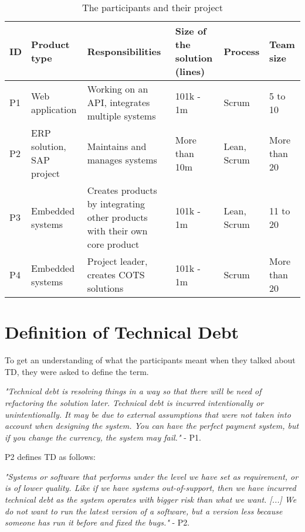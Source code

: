 \begin{table}[ht!]
	\centering
    \begin{tabular}{|p{0.5cm}|p{2.5cm}|p{3.5cm}|p{2cm}|p{2cm}|p{2cm}|}
    \hline
    \textbf{ID} & \textbf{Product type} & \textbf{Responsibilities} & \textbf{Size of the solution (lines)} & \textbf{Process} & \textbf{Team size}\\ \hline
    P1 & Web application & Working on an API, integrates multiple systems & 101k - 1m & Scrum & 5 to 10 \\ \hline
    P2 & ERP solution, SAP project & Maintains and manages systems & More than 10m & Lean, Scrum & More than 20 \\ \hline
    P3 & Embedded systems & Creates products by integrating other products with their own core product & 101k - 1m & Lean, Scrum & 11 to 20\\ \hline
    P4 & Embedded systems & Project leader, creates COTS solutions & 101k - 1m & Scrum & More than 20 \\ \hline
    \end{tabular}
    \caption{The participants and their project} \label{tab:participantsResponsbilities}
\end{table}







\section{Definition of Technical Debt}
\label{sec:techDebt}
To get an understanding of what the participants meant when they talked about TD, they were asked to define the term.
\begin{displayquote}
\textit{"Technical debt is resolving things in a way so that there will be need of refactoring the solution later. Technical debt is incurred intentionally or unintentionally. It may be due to external assumptions that were not taken into account when designing the system. You can have the perfect payment system, but if you change the currency, the system may fail."} - P1.  
\end{displayquote}

P2 defines TD as follows:
\begin{displayquote}
\textit{"Systems or software that performs under the level we have set as requirement, or is of lower quality. Like if we have systems out-of-support, then we have incurred technical debt as the system operates with bigger risk than what we want. [...] We do not want to run the latest version of a software, but a version less because someone has run it before and fixed the bugs."} - P2.
\end{displayquote}

